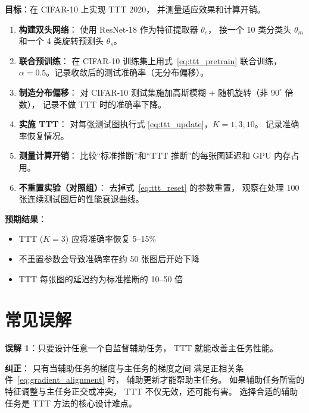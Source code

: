 \begin{labbox}[title=Lab 2：旋转自监督 TTT 的完整实现]
\textbf{目标}：在 CIFAR-10 上实现 TTT 2020，
并测量适应效果和计算开销。

\begin{enumerate}
  \item \textbf{构建双头网络}：
    使用 ResNet-18 作为特征提取器 $\theta_e$，
    接一个 10 类分类头 $\theta_m$ 和一个 4 类旋转预测头 $\theta_s$。

  \item \textbf{联合预训练}：
    在 CIFAR-10 训练集上用式~\eqref{eq:ttt_pretrain} 联合训练，
    $\alpha = 0.5$。记录收敛后的测试准确率（无分布偏移）。

  \item \textbf{制造分布偏移}：
    对 CIFAR-10 测试集施加高斯模糊 + 随机旋转（非 $90^\circ$ 倍数），
    记录不做 TTT 时的准确率下降。

  \item \textbf{实施 TTT}：
    对每张测试图执行式 \eqref{eq:ttt_update}，$K=1,3,10$。
    记录准确率恢复情况。

  \item \textbf{测量计算开销}：
    比较``标准推断''和``TTT 推断''的每张图延迟和 GPU 内存占用。

  \item \textbf{不重置实验（对照组）}：
    去掉式~\eqref{eq:ttt_reset} 的参数重置，
    观察在处理 100 张连续测试图后的性能衰退曲线。
\end{enumerate}

\textbf{预期结果}：
\begin{itemize}
  \item TTT ($K=3$) 应将准确率恢复 5--15\%
  \item 不重置参数会导致准确率在约 50 张图后开始下降
  \item TTT 每张图的延迟约为标准推断的 10--50 倍
\end{itemize}
\end{labbox}

\section{常见误解}
\label{sec:ttt_misconceptions}

\begin{misconceptionbox}
\textbf{误解 1}：只要设计任意一个自监督辅助任务，
TTT 就能改善主任务性能。

\textbf{纠正}：
只有当辅助任务的梯度与主任务的梯度之间
满足正相关条件~\eqref{eq:gradient_alignment} 时，
辅助更新才能帮助主任务。
如果辅助任务所需的特征调整与主任务正交或冲突，
TTT 不仅无效，还可能有害。
选择合适的辅助任务是 TTT 方法的核心设计难点。
\end{misconceptionbox}


